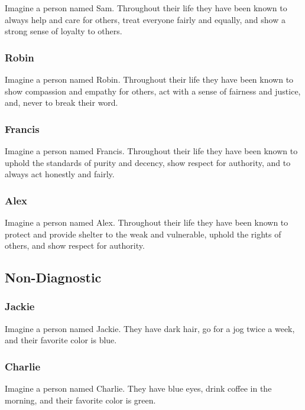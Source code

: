 \documentclass[
  man,floatsintext]{apa6}
\begin{document}
Imagine a person named Sam.
Throughout their life they have been known to always help and care for others, treat everyone fairly and equally, and show a strong sense of loyalty to others.

\subsubsection{Robin}\label{robin-1}

Imagine a person named Robin.
Throughout their life they have been known to show compassion and empathy for others, act with a sense of fairness and justice, and, never to break their word.

\subsubsection{Francis}\label{francis-1}

Imagine a person named Francis.
Throughout their life they have been known to uphold the standards of purity and decency, show respect for authority, and to always act honestly and fairly.

\subsubsection{Alex}\label{alex-1}

Imagine a person named Alex.
Throughout their life they have been known to protect and provide shelter to the weak and vulnerable, uphold the rights of others, and show respect for authority.

\subsection{Non-Diagnostic}\label{non-diagnostic}

\subsubsection{Jackie}\label{jackie-1}

Imagine a person named Jackie.
They have dark hair, go for a jog twice a week, and their favorite color is blue.

\subsubsection{Charlie}\label{charlie-1}

Imagine a person named Charlie.
They have blue eyes, drink coffee in the morning, and their favorite color is green.
\end{document}
